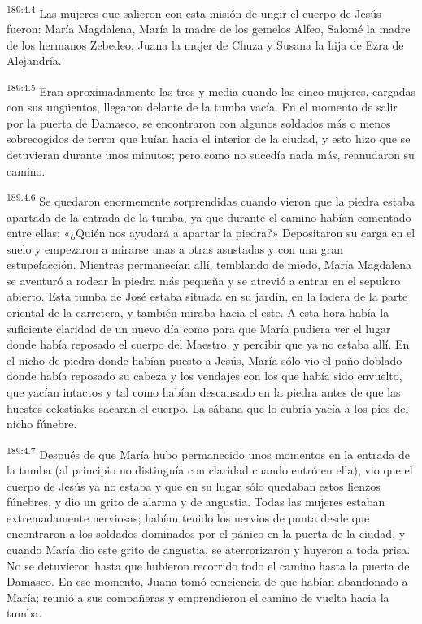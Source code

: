\par 
\textsuperscript{189:4.4} Las mujeres que salieron con esta misión de ungir el cuerpo de Jesús fueron: María Magdalena, María la madre de los gemelos Alfeo, Salomé la madre de los hermanos Zebedeo, Juana la mujer de Chuza y Susana la hija de Ezra de Alejandría.

\par 
\textsuperscript{189:4.5} Eran aproximadamente las tres y media cuando las cinco mujeres, cargadas con sus ung\"uentos, llegaron delante de la tumba vacía. En el momento de salir por la puerta de Damasco, se encontraron con algunos soldados más o menos sobrecogidos de terror que huían hacia el interior de la ciudad, y esto hizo que se detuvieran durante unos minutos; pero como no sucedía nada más, reanudaron su camino.

\par 
\textsuperscript{189:4.6} Se quedaron enormemente sorprendidas cuando vieron que la piedra estaba apartada de la entrada de la tumba, ya que durante el camino habían comentado entre ellas: «¿Quién nos ayudará a apartar la piedra?» Depositaron su carga en el suelo y empezaron a mirarse unas a otras asustadas y con una gran estupefacción. Mientras permanecían allí, temblando de miedo, María Magdalena se aventuró a rodear la piedra más pequeña y se atrevió a entrar en el sepulcro abierto. Esta tumba de José estaba situada en su jardín, en la ladera de la parte oriental de la carretera, y también miraba hacia el este. A esta hora había la suficiente claridad de un nuevo día como para que María pudiera ver el lugar donde había reposado el cuerpo del Maestro, y percibir que ya no estaba allí. En el nicho de piedra donde habían puesto a Jesús, María sólo vio el paño doblado donde había reposado su cabeza y los vendajes con los que había sido envuelto, que yacían intactos y tal como habían descansado en la piedra antes de que las huestes celestiales sacaran el cuerpo. La sábana que lo cubría yacía a los pies del nicho fúnebre.

\par 
\textsuperscript{189:4.7} Después de que María hubo permanecido unos momentos en la entrada de la tumba (al principio no distinguía con claridad cuando entró en ella), vio que el cuerpo de Jesús ya no estaba y que en su lugar sólo quedaban estos lienzos fúnebres, y dio un grito de alarma y de angustia. Todas las mujeres estaban extremadamente nerviosas; habían tenido los nervios de punta desde que encontraron a los soldados dominados por el pánico en la puerta de la ciudad, y cuando María dio este grito de angustia, se aterrorizaron y huyeron a toda prisa. No se detuvieron hasta que hubieron recorrido todo el camino hasta la puerta de Damasco. En ese momento, Juana tomó conciencia de que habían abandonado a María; reunió a sus compañeras y emprendieron el camino de vuelta hacia la tumba.

